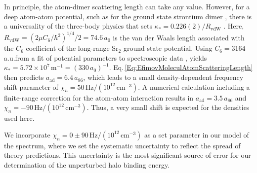 In principle, the atom-dimer scattering length can take any value.
However, for a deep atom-atom potential, such as for the ground state strontium dimer \cite{Stein2010}, there is a universality of the three-body physics that sets $\kappa_*=0.226(2)/R_{\mathrm{vdW}}$ \cite{wie12}.
Here, $R_{\mathrm{vdW}}=\left({2\mu C_6}/{\hbar^2}\right)^{1/4}/2=74.6$\,$a_0$ is the van der Waals length associated with the $C_6$ coefficient of the long-range Sr$_2$ ground state potential.
Using $C_6=3164$a.u.\;from a fit of potential parameters to spectroscopic data \cite{Stein2010}, yields $\kappa_*=5.72\times 10^7$\,m$^{-1}=(330\,a_0)^{-1}$.
Eq.\,\ref{Eq:EfimovMoleculAtomScatteringLength} then predicts $a_{\text{ad}}=6.4\, a_{86}$, which leads to a small density-dependent frequency shift parameter of $\chi_n=50\,\mathrm{Hz}/(10^{12}\,\mathrm{cm}^{-3})$.
A numerical calculation including a finite-range correction for the atom-atom interaction \cite{mwc17} results in $a_{\text{ad}}=3.5\, a_{86}$ and $\chi_n=-90\,\mathrm{Hz}/(10^{12}\,\mathrm{cm}^{-3})$.
Thus, a very small shift is expected for the densities used here.

We incorporate $\chi_n=0\pm 90 \,\mathrm{Hz}/(10^{12}\,\mathrm{cm}^{-3})$ as a set parameter in our model of the spectrum, where we set the systematic uncertainty to reflect the spread of theory predictions.
This uncertainty is the most significant source of error for our determination of the unperturbed halo binding energy.


